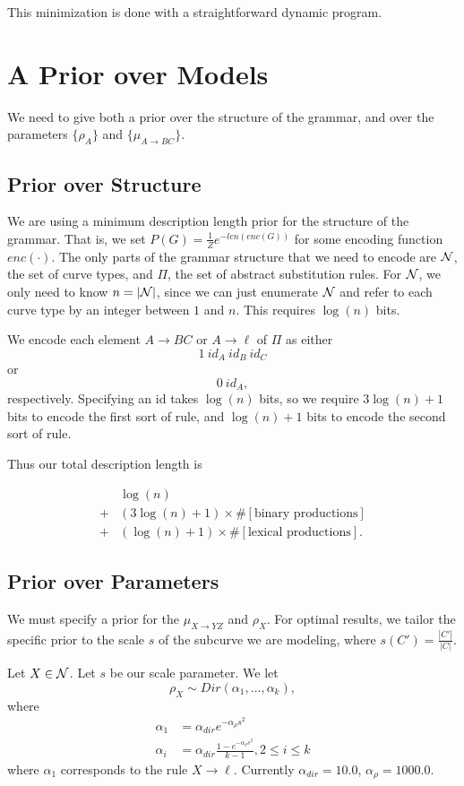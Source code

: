 \documentclass{article}
\begin{document}
This minimization is done with a straightforward dynamic program.

\section{A Prior over Models}


We need to give both a prior over the structure of the grammar, and over
the parameters $\{\rho_A\}$ and $\{\mu_{A\to BC}\}$.


\subsection{Prior over Structure}

We are using a minimum description length prior for the structure of
the grammar. That is, we set $P(G) = \frac{1}{Z} e^{-len(enc(G))}$ for
some encoding function $enc(\cdot)$.  The only parts of the grammar
structure that we need to encode are ${\mathcal N}$, the set of curve types,
and $\Pi$, the set of abstract substitution rules. For ${\mathcal N}$, we only
need to know $n = |{\mathcal N}|$, since we can just enumerate ${\mathcal N}$ and
refer to each curve type by an integer between $1$ and $n$. This
requires $\log(n)$ bits.

We encode each element $A\to BC$ or $A\to \ell$ of $\Pi$ as either
$$ 1\ id_A\ id_B\ id_C$$
or
$$ 0\ id_A, $$
respectively.  Specifying an id takes $\log(n)$ bits, so we require
$3\log(n) + 1$ bits to encode the first sort of rule, and $\log(n) +
1$ bits to encode the second sort of rule.

Thus our total description length is

\begin{align*}
&\log(n)  \\
+& (3\log(n) + 1)  \times \#[\text{binary productions}]\\
+& (\log(n) + 1) \times \#[\text{lexical productions}] .
\end{align*}

\subsection{Prior over Parameters}
\label{sec-prior-param}

We must specify a prior for the $\mu_{X\to YZ}$ and $\rho_X$.  For
optimal results, we tailor the specific prior to the scale $s$ of the
subcurve we are modeling, where $s(C') = \frac{|C'|}{|C|}$.

Let $X\in {\mathcal N}$. Let $s$ be our scale parameter. We let
$$\rho_X \sim Dir(\alpha_1, \dots, \alpha_k),$$
where
\begin{align*}
\alpha_1 &= \alpha_{dir} e^{- \alpha_{\rho} s^2} \\
\alpha_i &= \alpha_{dir} \frac{1 - e^{- \alpha_{\rho}s^2}}{k-1}, 2\le i\le k
\end{align*}
where $\alpha_1$ corresponds to the rule $X\to \ell$.
Currently $\alpha_{dir} = 10.0$, $\alpha_\rho = 1000.0$.
\end{document}

